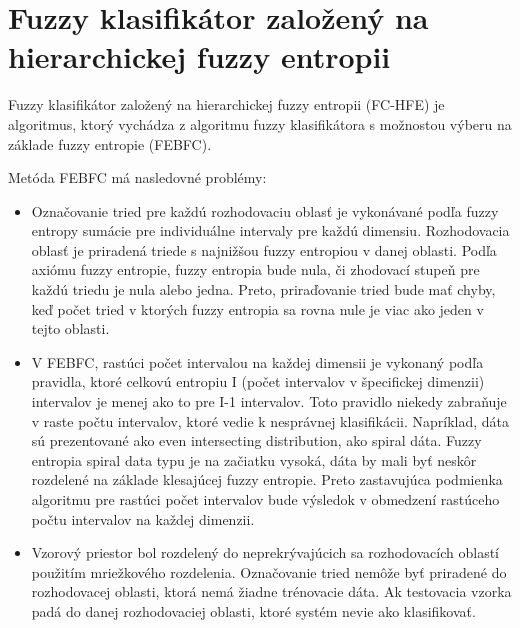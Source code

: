 \section{Fuzzy klasifikátor založený na hierarchickej fuzzy entropii}

Fuzzy klasifikátor založený na hierarchickej fuzzy entropii (FC-HFE) je algoritmus, ktorý vychádza z algoritmu fuzzy klasifikátora s možnostou výberu na základe fuzzy entropie (FEBFC). 

Metóda FEBFC má nasledovné problémy: 
\begin{itemize}
\item Označovanie tried pre každú rozhodovaciu oblasť je vykonávané podľa fuzzy entropy sumácie pre individuálne intervaly pre každú dimensiu. Rozhodovacia oblasť je priradená triede s najnižšou fuzzy entropiou v danej oblasti. Podľa axiómu fuzzy entropie, fuzzy entropia bude nula, či zhodovací stupeň pre každú triedu je nula alebo jedna. Preto, priraďovanie tried bude mať chyby, keď počet tried v ktorých fuzzy entropia sa rovna nule je viac ako jeden v tejto oblasti. 

\item V FEBFC, rastúci počet intervalou na každej dimensii je vykonaný podľa pravidla, ktoré celkovú entropiu I (počet intervalov v špecifickej dimenzii) intervalov je menej ako to pre I-1 intervalov. Toto pravidlo niekedy zabraňuje v raste počtu intervalov, ktoré vedie k nesprávnej klasifikácii. Napríklad, dáta sú prezentované ako even intersecting distribution, ako spiral dáta.  Fuzzy entropia spiral data typu je na začiatku vysoká, dáta by mali byť neskôr rozdelené na základe klesajúcej fuzzy entropie. Preto zastavujúca podmienka algoritmu pre rastúci počet intervalov bude výsledok v obmedzení rastúceho počtu intervalov na každej dimenzii. 

\item Vzorový priestor bol rozdelený do neprekrývajúcich sa rozhodovacích oblastí použitím mriežkového rozdelenia. Označovanie tried nemôže byť priradené do rozhodovacej oblasti, ktorá nemá žiadne trénovacie dáta. Ak testovacia vzorka padá do danej rozhodovaciej oblasti, ktoré systém nevie ako klasifikovať. 
\end{itemize}

